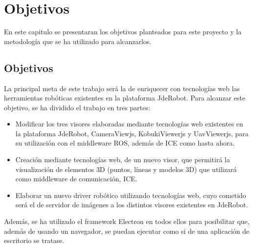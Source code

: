 \chapter{Objetivos}\label{cap.objetivos}
En este capitulo se presentaran los objetivos planteados para este proyecto y la metodología que se ha utilizado para alcanzarlos.

\section{Objetivos}
La principal meta de este trabajo será la de enriquecer con tecnologías web las herramientas robóticas existentes en la plataforma JdeRobot. Para alcanzar este objetivo, se ha dividido el trabajo en tres partes: 
\begin{itemize}
\item Modificar los tres visores elaboradas mediante tecnologías web existentes en la plataforma JdeRobot, CameraViewjs, KobukiViewerjs y UavViewerjs, para su utilización con el middleware ROS, además de ICE como hasta ahora. 
\item Creación mediante tecnologías web, de un nuevo visor, que permitirá la visualización de elementos 3D (puntos, líneas y modelos 3D) que utilizará como middleware de comunicación, ICE.
\item Elaborar un nuevo driver robótico utilizando tecnologías web, cuyo cometido será el de servidor de imágenes a los distintos visores existentes en JdeRobot.
\end{itemize}
Además, se ha utilizado el framework Electron en todos ellos para posibilitar que, además de usando un navegador, se puedan ejecutar como si de una aplicación de escritorio se tratase.

